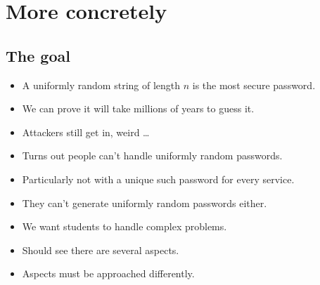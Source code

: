 \section{More concretely}

\subsection{The goal}

\begin{frame}
  \begin{example}
    \begin{itemize}
      \item A uniformly random string of length \(n\) is the most secure 
        password.

      \item We can prove it will take millions of years to guess it.
    \end{itemize}
  \end{example}

  \pause

  \begin{remark}
    \begin{itemize}
      \item Attackers still get in, weird \dots
    \end{itemize}
  \end{remark}
\end{frame}

\begin{frame}
  \begin{example}[Usability]
    \begin{itemize}
      \item Turns out people can't handle uniformly random passwords.
      \item Particularly not with a unique such password for every service.
      \item They can't generate uniformly random passwords either.
    \end{itemize}
  \end{example}

  \pause

  \begin{remark}
    \begin{itemize}
      \item We want students to handle complex problems.
      \item Should see there are several aspects.
      \item Aspects must be approached differently.
    \end{itemize}
  \end{remark}
\end{frame}


